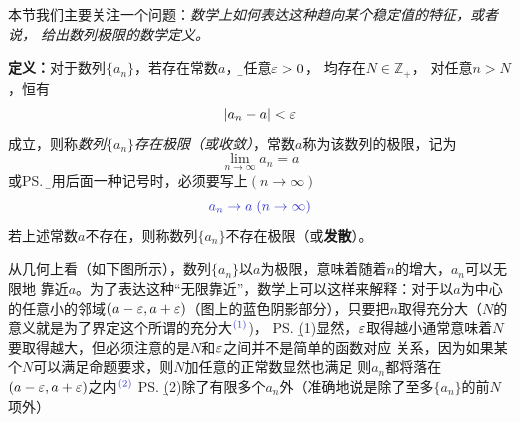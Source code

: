 \bigskip

本节我们主要关注一个问题：{\it 数学上如何表达这种趋向某个稳定值的特征，或者说，
给出数列极限的数学定义。}

{\bf 定义：}对于数列$\{a_n\}$，若存在常数$a$，{\b 对任意$\varepsilon>0$，
均存在$N\in\mathbb{Z}_+$，
对任意$n>N$，恒有
$$|a_n-a|<\varepsilon$$
成立}，则称{\it 数列$\{a_n\}$存在极限（或收敛）}，常数$a$称为该数列的极限，记为
$$\lim_{n\to\infty}a_n=a$$
或\ps{\b 使用后面一种记号时，必须要写上$(n\to\infty)$}
$${\b a_n\to a\;(n\to\infty)}$$
若上述常数$a$不存在，则称数列$\{a_n\}$不存在极限（或{\bf 发散}）。

从几何上看（如下图所示），数列$\{a_n\}$以$a$为极限，意味着随着$n$的增大，$a_n$可以无限地
靠近$a$。为了表达这种“无限靠近”，数学上可以这样来解释：对于以$a$为中心的任意小的邻域$(a-\varepsilon,
a+\varepsilon)$（图上的蓝色阴影部分），只要把$n$取得充分大（$N$的意义就是为了界定这个所谓的充分大$^{\b (1)}$)，
\ps{\b (1)显然，$\varepsilon$取得越小通常意味着$N$要取得越大，但必须注意的是$N$和$\varepsilon$之间并不是简单的函数对应
关系，因为如果某个$N$可以满足命题要求，则$N$加任意的正常数显然也满足}
则$a_n$都将落在$(a-\varepsilon,a+\varepsilon)$之内$^{\b (2)}$
\ps{\b (2)除了有限多个$a_n$外（准确地说是除了至多$\{a_n\}$的前$N$项外）}

